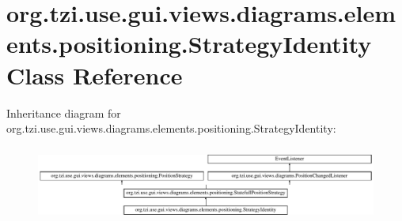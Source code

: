 \hypertarget{classorg_1_1tzi_1_1use_1_1gui_1_1views_1_1diagrams_1_1elements_1_1positioning_1_1_strategy_identity}{\section{org.\-tzi.\-use.\-gui.\-views.\-diagrams.\-elements.\-positioning.\-Strategy\-Identity Class Reference}
\label{classorg_1_1tzi_1_1use_1_1gui_1_1views_1_1diagrams_1_1elements_1_1positioning_1_1_strategy_identity}
}
Inheritance diagram for org.\-tzi.\-use.\-gui.\-views.\-diagrams.\-elements.\-positioning.\-Strategy\-Identity\-:\begin{figure}[H]
\begin{center}
\leavevmode
\includegraphics[height=2.500000cm]{classorg_1_1tzi_1_1use_1_1gui_1_1views_1_1diagrams_1_1elements_1_1positioning_1_1_strategy_identity}
\end{center}
\end{figure}
